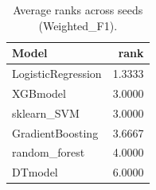 \begin{table}[t]
\centering
\begin{tabular}{lr}
\toprule
Model & rank \\
\midrule
LogisticRegression & 1.3333 \\
XGBmodel & 3.0000 \\
sklearn_SVM & 3.0000 \\
GradientBoosting & 3.6667 \\
random_forest & 4.0000 \\
DTmodel & 6.0000 \\
\bottomrule
\end{tabular}
\caption{Average ranks across seeds (Weighted_F1).}
\label{tab:avg_rank_Weighted_F1}
\end{table}